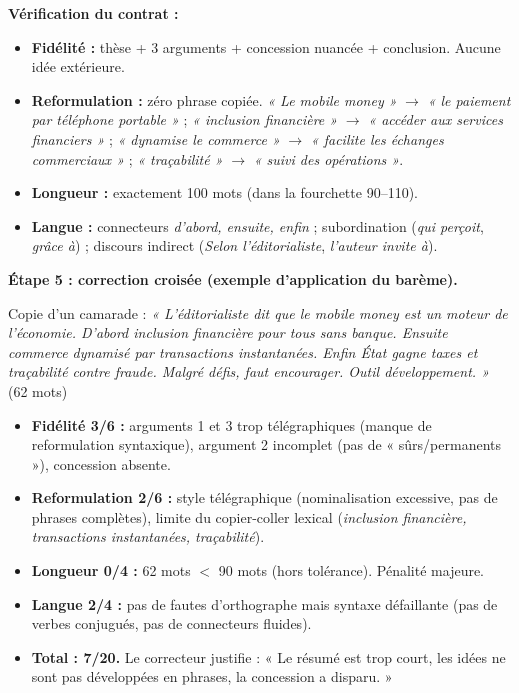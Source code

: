 \documentclass[11pt]{article}
\begin{document}
\begin{exoresolu}
\textbf{Vérification du contrat :}
\begin{itemize}
\item \textbf{Fidélité :} thèse + 3 arguments + concession nuancée + conclusion. Aucune idée extérieure.
\item \textbf{Reformulation :} zéro phrase copiée. \emph{« Le mobile money »} $\rightarrow$ \emph{« le paiement par téléphone portable »} ; \emph{« inclusion financière »} $\rightarrow$ \emph{« accéder aux services financiers »} ; \emph{« dynamise le commerce »} $\rightarrow$ \emph{« facilite les échanges commerciaux »} ; \emph{« traçabilité »} $\rightarrow$ \emph{« suivi des opérations »}.
\item \textbf{Longueur :} exactement 100 mots (dans la fourchette 90--110).
\item \textbf{Langue :} connecteurs \emph{d'abord, ensuite, enfin} ; subordination (\emph{qui perçoit}, \emph{grâce à}) ; discours indirect (\emph{Selon l'éditorialiste}, \emph{l'auteur invite à}).
\end{itemize}

\textbf{Étape 5 : correction croisée (exemple d'application du barème).}

Copie d'un camarade : \emph{« L'éditorialiste dit que le mobile money est un moteur de l'économie. D'abord inclusion financière pour tous sans banque. Ensuite commerce dynamisé par transactions instantanées. Enfin État gagne taxes et traçabilité contre fraude. Malgré défis, faut encourager. Outil développement. »} (62 mots)

\begin{itemize}
\item \textbf{Fidélité 3/6 :} arguments 1 et 3 trop télégraphiques (manque de reformulation syntaxique), argument 2 incomplet (pas de « sûrs/permanents »), concession absente.
\item \textbf{Reformulation 2/6 :} style télégraphique (nominalisation excessive, pas de phrases complètes), limite du copier-coller lexical (\emph{inclusion financière, transactions instantanées, traçabilité}).
\item \textbf{Longueur 0/4 :} 62 mots $<$ 90 mots (hors tolérance). Pénalité majeure.
\item \textbf{Langue 2/4 :} pas de fautes d'orthographe mais syntaxe défaillante (pas de verbes conjugués, pas de connecteurs fluides).
\item \textbf{Total : 7/20.} Le correcteur justifie : « Le résumé est trop court, les idées ne sont pas développées en phrases, la concession a disparu. »
\end{itemize}
\end{exoresolu}
\end{document}
